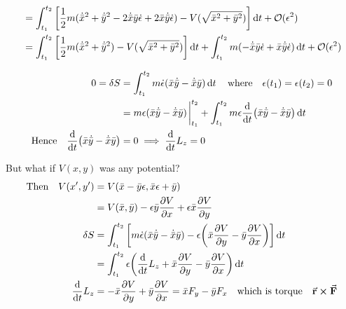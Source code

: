 \documentclass{article}
\begin{document}
\begin{align*}
                     & =\int_{t_1}^{t_2}\bqty{\frac{1}{2}m(\dot{\bar{x}}^2+\dot{\bar{y}}^2 -2\dot{\bar{x}}\bar{y}\dot{\epsilon}+2\bar{x}\dot{\bar{y}}\dot{\epsilon})-V(\sqrt{\bar{x}^2+\bar{y}^2})}\dd{t}+\mathcal{O}(\epsilon^2)                                                                         \\
                     & =\int_{t_1}^{t_2}\bqty{\frac{1}{2}m(\dot{\bar{x}}^2+\dot{\bar{y}}^2)-V(\sqrt{\bar{x}^2+\bar{y}^2})}\dd{t} +\int_{t_1}^{t_2}m(-\dot{\bar{x}}\bar{y}\dot{\epsilon}+\bar{x}\dot{\bar{y}}\dot{\epsilon})\dd{t}+\mathcal{O}(\epsilon^2)                                                 \\
\end{align*}

\begin{align*}
    0=\var{S}                                                    & =\int_{t_1}^{t_2}m\dot{\epsilon}(\bar{x}\dot{\bar{y}}-\dot{\bar{x}}\bar{y})\dd{t}\qq{where}\epsilon(t_1)=\epsilon(t_2)=0                                \\
                                                                 & =m\epsilon(\bar{x}\dot{\bar{y}}-\dot{\bar{x}}\bar{y})\eval_{t_1}^{t_2}+\int_{t_1}^{t_2}m\epsilon\dv{t}(\bar{x}\dot{\bar{y}}-\dot{\bar{x}}\bar{y})\dd{t} \\
    \qq*{Hence}\dv{t}(\bar{x}\dot{\bar{y}}-\dot{\bar{x}}\bar{y}) & =0\implies \dv{t}L_z=0
\end{align*}

But what if $V(x,y)$ was any potential?
\begin{align*}
    \qq*{Then} V(x',y') & =V(\bar{x}-\bar{y}\epsilon  , \bar{x}\epsilon+\bar{y}   )                                                                                    \\
                        & = V(\bar{x},\bar{y})-\epsilon\bar{y}\pdv{V}{x} +\epsilon\bar{x}\pdv{V}{y}                                                                    \\
    \var{S}             & =\int_{t_1}^{t_2}\bqty{m\dot{\epsilon}(\bar{x}\dot{\bar{y}}-\dot{\bar{x}}\bar{y})-\epsilon\pqty{\bar{x}\pdv{V}{y}-\bar{y}\pdv{V}{x} }}\dd{t} \\
                        & =\int_{t_1}^{t_2}\epsilon\pqty{\dv{t}L_z
        +\bar{x}\pdv{V}{y}    -\bar{y}\pdv{V}{x}}\dd{t}                                                                                                                \\
    \dv{t}L_z           & =
    -\bar{x}\pdv{V}{y}    +\bar{y}\pdv{V}{x}=\bar{x}F_y-\bar{y}F_x\qq{which is torque} \va{r}\cross\va{F}
\end{align*}
\end{document}
